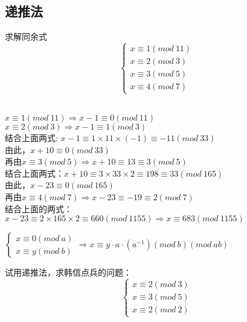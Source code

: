 \documentclass[cn,10pt]{elegantbook}
\begin{document}
\subsection{递推法}
\begin{example}
  求解同余式
  \[
    \begin{cases}
      x \equiv 1(mod\ 11)
     \\ x \equiv 2(mod\ 3)
     \\ x \equiv 3(mod\ 5)
    \\  x \equiv 4(mod\ 7)
    \end{cases}
  \]
\end{example}
\begin{solution}
  \\ $x \equiv 1(mod\ 11) \Rightarrow x-1 \equiv 0(mod\ 11)$
  \\ $x \equiv 2(mod\ 3)  \Rightarrow x -1 \equiv 1(mod\ 3)$
  \\ 结合上面两式: $x-1 \equiv 1 \times 11 \times (-1) \equiv -11(mod\ 33)$
  \\由此，$x+10 \equiv 0(mod\ 33)$
  \\再由$x \equiv 3 (mod\ 5) \Rightarrow x+10 \equiv 13 \equiv 3(mod\ 5)$
  \\结合上面两式：$x+10 \equiv 3 \times 33 \times 2 \equiv 198 \equiv 33(mod\ 165)$
  \\由此，$x-23 \equiv 0(mod\ 165)$
  \\再由$x \equiv 4(mod\ 7) \Rightarrow x-23 \equiv -19 \equiv 2(mod\ 7)$
  \\结合上面的两式：$x-23 \equiv 2 \times 165 \times 2 \equiv 660(mod\ 1155) \Rightarrow x \equiv 683(mod\ 1155)$

\end{solution}
\begin{conclusion}
  $\begin{cases}
    x \equiv 0(mod\ a)
    \\ x \equiv y(mod\ b)
  \end{cases}
  \Rightarrow
  x \equiv y \cdot a \cdot (a^{-1})(mod\ b) (mod\ ab)$
\end{conclusion}
\vskip 0.5cm
\begin{example}
  试用递推法，求韩信点兵的问题：
  \[\begin{cases}
    x \equiv 2(mod\ 3)
    \\ x \equiv 3(mod\ 5)
    \\ x \equiv 2(mod\ 2)
  \end{cases}\]
\end{example}
\end{document}
